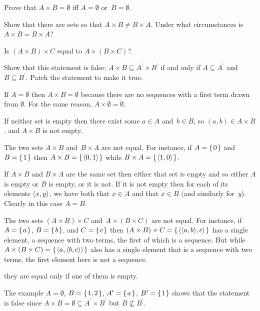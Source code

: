 \documentclass{ibl}  %
\begin{document}
\begin{ex}
\begin{exes}
\item Prove that $A\times B=\emptyset$ iff $A=\emptyset$ or~$B=\emptyset$.
\item Show that there are sets so that $A\times B\neq B\times A$.
  Under what circumstances is $A\times B=B\times A$?
\item Is $(A\times B)\times C$ equal to $A\times (B\times C)$?
\item Show that this statement is false: 
  $A\times B\subseteq A^\prime\times B^\prime$ if and only if
  $A\subseteq A^\prime$ and $B\subseteq B^\prime$.
  Patch the statement to make it true.
\end{exes}
\begin{ans}
\begin{exes}
\item If $A=\emptyset$ then $A\times B=\emptyset$ because there are no 
  sequences with a first term drawn from $\emptyset$.
  For the same reason, $A\times\emptyset=\emptyset$.
 
  If neither set is empty then there exist some $a\in A$ and~$b\in B$, so 
  $(a,b)\in A\times B$, and $A\times B$ is not empty.
\item The two sets $A\times B$ and~$B\times A$ are not equal. 
  For instance, if $A=\mbox{$\{\hspace{0.1em}0\hspace{0.1em}\}$}$ and~$B=\mbox{$\{\hspace{0.1em}1\hspace{0.1em}\}$}$ then 
  $A\times B=\mbox{$\{\hspace{0.1em}\langle0,1\rangle\hspace{0.1em}\}$}$
  while
  $B\times A=\mbox{$\{\hspace{0.1em}\langle1,0\rangle\hspace{0.1em}\}$}$.

  If $A\times B$ and $B\times A$ are the same set then either that set is empty 
  and so either $A$ is empty or $B$ is empty,
  or it is not.
  If it is not empty then for each of its elements $\langle x,y\rangle$,
  we have both that $x\in A$ and that $x\in B$ (and similarly for~$y$).
  Clearly in this case $A=B$.
\item The two sets $(A\times B)\times C$ and~$A\times (B\times C)$ 
  are not equal.
  For instance, if $A=\mbox{$\{\hspace{0.1em}a\hspace{0.1em}\}$}$, $B=\mbox{$\{\hspace{0.1em}b\hspace{0.1em}\}$}$, and $C=\mbox{$\{\hspace{0.1em}c\hspace{0.1em}\}$}$ then 
  $(A\times B)\times C=\mbox{$\{\hspace{0.1em}\langle\langle a,b\rangle,c\rangle\hspace{0.1em}\}$}$
  has a single element, a sequence with two terms, the first
  of which is a sequence.
  But while $A\times(B\times C)=\mbox{$\{\hspace{0.1em}\langle a,\langle b,c\rangle\rangle\hspace{0.1em}\}$}$ 
  also has a single element that is a sequence with two terms, 
  the first element here is not a sequence. 

  \remark they are equal only if one of them is empty.
\item The example 
  $A=\emptyset$, $B=\mbox{$\{\hspace{0.1em}1,2\hspace{0.1em}\}$}$, $A^\prime=\mbox{$\{\hspace{0.1em}a\hspace{0.1em}\}$}$, $B^\prime=\mbox{$\{\hspace{0.1em}1\hspace{0.1em}\}$}$
  shows that the statement is false since 
  $A\times B=\emptyset\subseteq A^\prime\times B^\prime$ but 
  $B\not\subseteq B^\prime$.


\end{exes}
\end{ans}
\end{ex}
\end{document}
